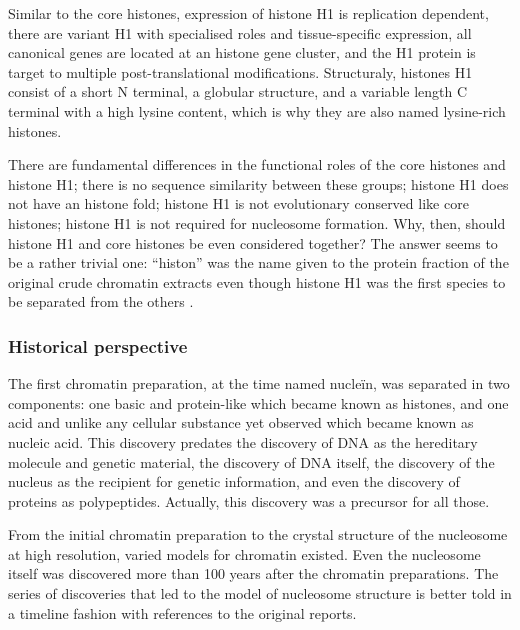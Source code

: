       Similar to the core histones, expression of histone H1 is
      replication dependent, there are variant H1 with specialised
      roles and tissue-specific expression, all canonical genes
      are located at an histone gene cluster, and the H1 protein
      is target to multiple post-translational modifications.
      Structuraly, histones H1 consist of a short N terminal, a globular
      structure, and a variable length C terminal with a high lysine
      content, which is why they are also named lysine-rich histones.

      There are fundamental differences in the functional roles of
      the core histones and histone H1;
      there is no sequence similarity between these groups;
      histone H1 does not have an histone fold;
      histone H1 is not evolutionary conserved like core histones;
      histone H1 is not required for nucleosome formation.
      Why, then, should histone H1 and core histones be even considered together?
      The answer seems to be a rather trivial one:
      ``histon'' was the name given to the protein fraction of
      the original crude chromatin extracts \citep{kossel1884-histones}
      even though histone H1 was the first species to be separated from
      the others \citep{stedman1951main-histones-separation}.

    \subsubsection{Historical perspective}

      The first chromatin preparation, at the time named nucleïn, was
      separated in two components: one basic and protein-like which
      became known as histones, and one acid and unlike any cellular
      substance yet observed which became known as nucleic acid.
      This discovery predates the discovery of DNA as the hereditary
      molecule and genetic material, the discovery of DNA itself,
      the discovery of the nucleus as the recipient for genetic
      information, and even the discovery of proteins as polypeptides.
      Actually, this discovery was a precursor for all those.

      From the initial chromatin preparation to the crystal structure of
      the nucleosome at high resolution, varied models for chromatin
      existed.  Even the nucleosome itself was discovered more than 100 years
      after the chromatin preparations.
      The series of discoveries that led to the model of nucleosome
      structure is better told in a timeline fashion with references
      to the original reports.

